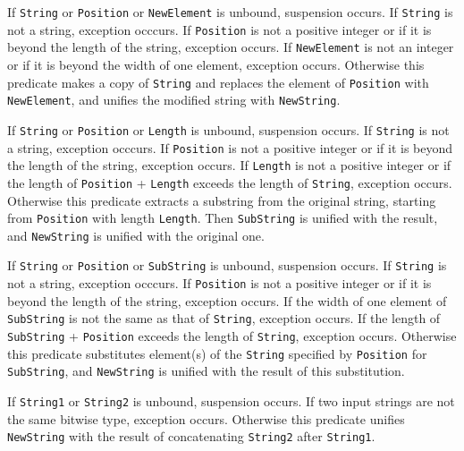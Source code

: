 \begin{itemize}
If \verb|String| or \verb|Position| or \verb|NewElement| is unbound,
suspension occurs.
If \verb|String| is not a string, exception occcurs.
If \verb|Position| is not a positive integer or if it is beyond the length of
the string, exception occurs.
If \verb|NewElement| is not an integer or if it is beyond the width of one
element, exception occurs.
Otherwise this predicate makes a copy of \verb|String| and replaces
the element of \verb|Position| with \verb|NewElement|, and
unifies the modified string with \verb|NewString|.

If \verb|String| or \verb|Position| or \verb|Length| is unbound,
suspension occurs.
If \verb|String| is not a string, exception occcurs.
If \verb|Position| is not a positive integer or if it is beyond the length of
the string, exception occurs.
If \verb|Length| is not a positive integer or if the length of \verb|Position|
+ \verb|Length| exceeds the length of \verb|String|, exception occurs.
Otherwise this predicate extracts a substring from the original string,
starting from \verb|Position| with length \verb|Length|.
Then \verb|SubString| is unified with the result, and \verb|NewString| is
unified with the original one.

If \verb|String| or \verb|Position| or \verb|SubString| is unbound,
suspension occurs.
If \verb|String| is not a string, exception occcurs.
If \verb|Position| is not a positive integer or if it is beyond the length of
the string, exception occurs.
If the width of one element of \verb|SubString| is not the same as that of
\verb|String|, exception occurs.
If the length of \verb|SubString| + \verb|Position| exceeds the length of
\verb|String|, exception occurs.
Otherwise this predicate substitutes element(s) of the \verb|String| specified
by \verb|Position| for \verb|SubString|, and \verb|NewString| is unified with
the result of this substitution.

If \verb|String1| or \verb|String2| is unbound, suspension occurs.
If two input strings are not the same bitwise type, exception occurs.
Otherwise this predicate unifies \verb|NewString| with the result of
concatenating \verb|String2| after \verb|String1|.

\end{itemize}
